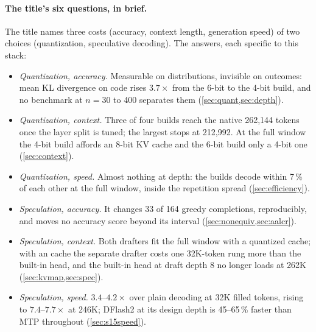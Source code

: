 \paragraph{The title's six questions, in brief.} The title names three costs (accuracy, context length,
generation speed) of two choices (quantization, speculative decoding). The answers, each specific to
this stack:
\begin{itemize}
\item \emph{Quantization, accuracy.} Measurable on distributions, invisible on outcomes: mean KL
divergence on code rises $3.7\times$ from the 6-bit to the 4-bit build, and no benchmark at
$n=30$ to 400 separates them (\cref{sec:quant,sec:depth}).
\item \emph{Quantization, context.} Three of four builds reach the native 262{,}144 tokens once the
layer split is tuned; the largest stops at 212{,}992. At the full window the 4-bit build affords an
8-bit KV cache and the 6-bit build only a 4-bit one (\cref{sec:context}).
\item \emph{Quantization, speed.} Almost nothing at depth: the builds decode within 7\,\% of each
other at the full window, inside the repetition spread (\cref{sec:efficiency}).
\item \emph{Speculation, accuracy.} It changes 33 of 164 greedy completions, reproducibly, and moves
no accuracy score beyond its interval (\cref{sec:nonequiv,sec:aalcr}).
\item \emph{Speculation, context.} Both drafters fit the full window with a quantized cache; with an
 cache the separate drafter costs one 32K-token rung more than the built-in head, and the
built-in head at draft depth 8 no longer loads at 262K (\cref{sec:kvmap,sec:spec}).
\item \emph{Speculation, speed.} $3.4$--$4.2\times$ over plain decoding at 32K filled tokens, rising to
$7.4$--$7.7\times$ at 246K; DFlash2 at its design depth is 45--65\,\% faster than MTP throughout
(\cref{sec:s15speed}).
\end{itemize}

